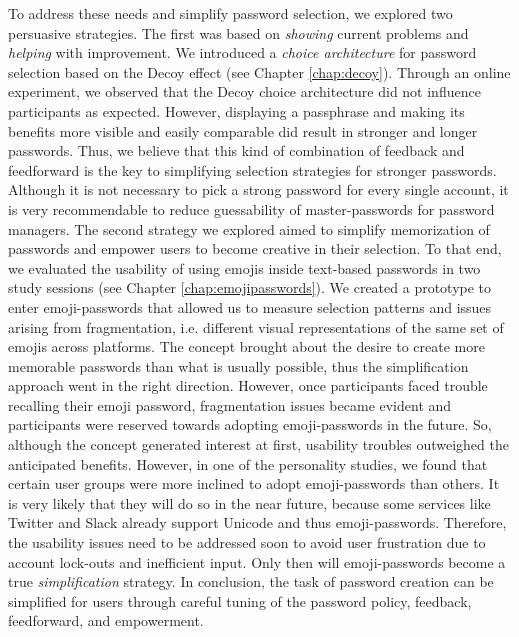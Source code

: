 To address these needs and simplify password selection, we explored two persuasive strategies. The first was based on \textit{showing} current problems and \textit{helping} with improvement. We introduced a \textit{choice architecture} for password selection based on the Decoy effect (see Chapter \ref{chap:decoy}). Through an online experiment, we observed that the Decoy choice architecture did not influence participants as expected. However, displaying a passphrase and making its benefits more visible and easily comparable did result in stronger and longer passwords. Thus, we believe that this kind of combination of feedback and feedforward is the key to simplifying selection strategies for stronger passwords. Although it is not necessary to pick a strong password for every single account, it is very recommendable to reduce guessability of master-passwords for password managers. 
The second strategy we explored aimed to simplify memorization of passwords and empower users to become creative in their selection. To that end, we evaluated the usability of using emojis inside text-based passwords in two study sessions (see Chapter \ref{chap:emojipasswords}). We created a prototype to enter emoji-passwords that allowed us to measure selection patterns and issues arising from fragmentation, i.e. different visual representations of the same set of emojis across platforms. The concept brought about the desire to create more memorable passwords than what is usually possible, thus the simplification approach went in the right direction. However, once participants faced trouble recalling their emoji password, fragmentation issues became evident and participants were reserved towards adopting emoji-passwords in the future. So, although the concept generated interest at first, usability troubles outweighed the anticipated benefits. However, in one of the personality studies, we found that certain user groups were more inclined to adopt emoji-passwords than others. It is very likely that they will do so in the near future, because some services like Twitter and Slack already support \gls{Unicode} and thus emoji-passwords. Therefore, the usability issues need to be addressed soon to avoid user frustration due to account lock-outs and inefficient input. Only then will emoji-passwords become a true \textit{simplification} strategy. In conclusion, the task of password creation can be simplified for users through careful tuning of the password policy, feedback, feedforward, and empowerment. 

